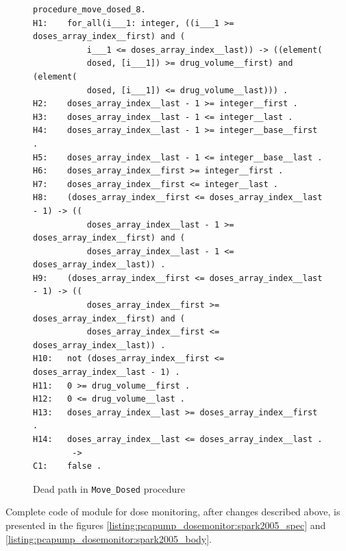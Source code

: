 \begin{figure}
\singlespacing
\begin{lstlisting}[frame=single, gobble=0]
procedure_move_dosed_8.
H1:    for_all(i___1: integer, ((i___1 >= doses_array_index__first) and (
           i___1 <= doses_array_index__last)) -> ((element(
           dosed, [i___1]) >= drug_volume__first) and (element(
           dosed, [i___1]) <= drug_volume__last))) .
H2:    doses_array_index__last - 1 >= integer__first .
H3:    doses_array_index__last - 1 <= integer__last .
H4:    doses_array_index__last - 1 >= integer__base__first .
H5:    doses_array_index__last - 1 <= integer__base__last .
H6:    doses_array_index__first >= integer__first .
H7:    doses_array_index__first <= integer__last .
H8:    (doses_array_index__first <= doses_array_index__last - 1) -> ((
           doses_array_index__last - 1 >= doses_array_index__first) and (
           doses_array_index__last - 1 <= doses_array_index__last)) .
H9:    (doses_array_index__first <= doses_array_index__last - 1) -> ((
           doses_array_index__first >= doses_array_index__first) and (
           doses_array_index__first <= doses_array_index__last)) .
H10:   not (doses_array_index__first <= doses_array_index__last - 1) .
H11:   0 >= drug_volume__first .
H12:   0 <= drug_volume__last .
H13:   doses_array_index__last >= doses_array_index__first .
H14:   doses_array_index__last <= doses_array_index__last .
        ->
C1:    false .
\end{lstlisting}
\doublespacing
\caption{Dead path in \lstinline{Move_Dosed} procedure}
\label{listing:pcapump_dosemonitor:dead_path}
\end{figure}

Complete code of module for dose monitoring, after changes described above, is presented in the figures \ref{listing:pcapump_dosemonitor:spark2005_spec} and \ref{listing:pcapump_dosemonitor:spark2005_body}.

